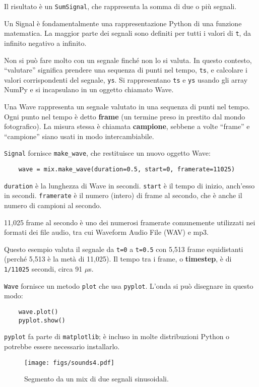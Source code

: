 \documentclass[12pt,a4paper]{book}
\begin{document}
Il risultato è un {\tt SumSignal}, che rappresenta la somma di due o più segnali.

Un Signal è fondamentalmente una rappresentazione Python di una funzione matematica. La maggior parte dei segnali sono definiti per tutti i valori di {\tt t}, da infinito negativo a infinito.

Non si può fare molto con un segnale finché non lo si valuta. In questo contesto, ``valutare'' significa prendere una sequenza di punti nel tempo, {\tt ts}, e calcolare i valori corrispondenti del segnale, {\tt ys}. Si rappresentano {\tt ts} e {\tt ys} usando gli array NumPy e si incapsulano in un oggetto chiamato Wave.

Una Wave rappresenta un segnale valutato in una sequenza di punti nel tempo. Ogni punto nel tempo è detto {\bf frame} (un termine preso in prestito dal mondo fotografico). La misura stessa è chiamata {\bf campione}, sebbene a volte ``frame'' e ``campione'' siano usati in modo intercambiabile.

{\tt Signal} fornisce \verb"make_wave", che restituisce un nuovo oggetto Wave:

\begin{verbatim} 
    wave = mix.make_wave(duration=0.5, start=0, framerate=11025)
 \end{verbatim} 

{\tt duration} è la lunghezza di Wave in secondi. {\tt start} è il tempo di inizio, anch'esso in secondi. {\tt framerate} è il numero (intero) di frame al secondo, che è anche il numero di campioni al secondo.

11,025 frame al secondo è uno dei numerosi framerate comunemente utilizzati nei formati dei file audio, tra cui Waveform Audio File (WAV) e mp3.

Questo esempio valuta il segnale da {\tt t=0} a {\tt t=0.5} con 5,513 frame equidistanti (perché 5,513 è la metà di 11,025). Il tempo tra i frame, o {\bf timestep}, è di {\tt 1/11025} secondi, circa 91 $\mu$s.

{\tt Wave} fornisce un metodo {\tt plot} che usa {\tt pyplot}. L'onda si può disegnare in questo modo:

\begin{verbatim} 
    wave.plot()
    pyplot.show()
 \end{verbatim} 

{\tt pyplot} fa parte di {\tt matplotlib}; è incluso in molte distribuzioni Python o potrebbe essere necessario installarlo.

\begin{figure} 

\centerline{\texttt{[image: figs/sounds4.pdf]}} \caption{Segmento da un mix di due segnali sinusoidali.} \label{fig.sounds4} \end{figure} 
\end{document}
